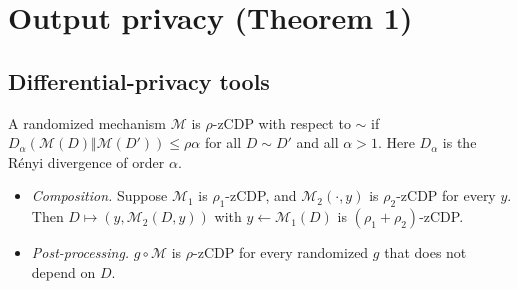 \section{Output privacy (Theorem 1)}
\label{sec:out}

\subsection{Differential-privacy tools}

\begin{definition}
A randomized mechanism $\mathcal M$ is $\rho$-zCDP with respect to $\sim$ if $D_\alpha(\mathcal M(D)\Vert\mathcal M(D'))\le\rho\alpha$ for all $D\sim D'$ and all $\alpha>1$. Here $D_\alpha$ is the R\'enyi divergence of order $\alpha$.
\end{definition}

\begin{lemma}\label{lem:zcomp}
\begin{itemize}[nosep]
  \item \emph{Composition.} Suppose $\mathcal M_1$ is $\rho_1$-zCDP, and $\mathcal M_2(\cdot,y)$ is $\rho_2$-zCDP for every $y$. Then $D\mapsto(y,\mathcal M_2(D,y))$ with $y\gets\mathcal M_1(D)$ is $(\rho_1+\rho_2)$-zCDP.
  \item \emph{Post-processing.} $g\circ\mathcal M$ is $\rho$-zCDP for every randomized $g$ that does not depend on $D$.
\end{itemize}
\end{lemma}

